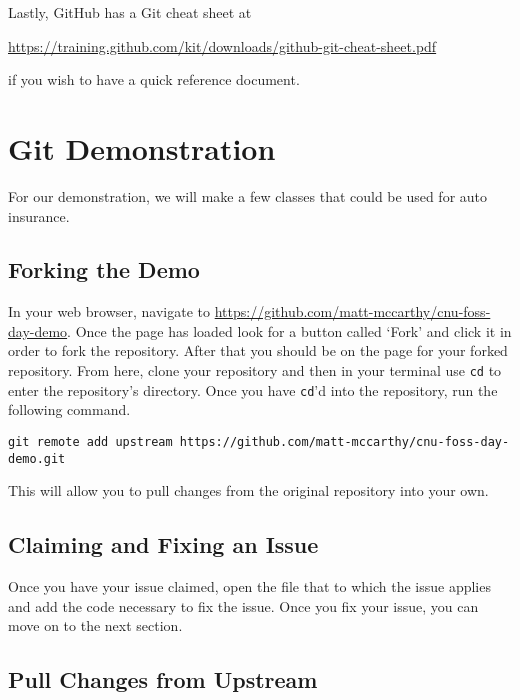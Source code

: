 \documentclass[notitlepage]{simple}
\begin{document}
Lastly, GitHub has a Git cheat sheet at
\begin{center}
\url{https://training.github.com/kit/downloads/github-git-cheat-sheet.pdf}
\end{center}
if you wish to have a quick reference document.


\section{Git Demonstration}

For our demonstration, we will make a few classes that could be used for auto insurance.

\subsection{Forking the Demo}

In your web browser, navigate to \url{https://github.com/matt-mccarthy/cnu-foss-day-demo}.
Once the page has loaded look for a button called `Fork' and click it in order to fork the repository.
After that you should be on the page for your forked repository.
From here, clone your repository and then in your terminal use \verb|cd| to enter the repository's directory.
Once you have \verb|cd|'d into the repository, run the following command.
\begin{terminal}
\verb|git remote add upstream https://github.com/matt-mccarthy/cnu-foss-day-demo.git|
\end{terminal}
This will allow you to pull changes from the original repository into your own.

\subsection{Claiming and Fixing an Issue}


Once you have your issue claimed, open the file that to which the issue applies and add the code necessary to fix the issue.
Once you fix your issue, you can move on to the next section.

\subsection{Pull Changes from Upstream}
\end{document}
